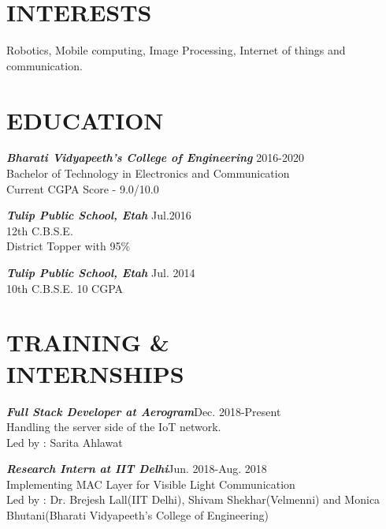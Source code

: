 \documentclass[margin, 10pt]{res} %
\begin{document}
\begin{resume}

 
\section{INTERESTS}  

Robotics, Mobile computing, Image Processing, Internet of things and communication.

\section{EDUCATION} 
{\sl \bf{Bharati Vidyapeeth's College of Engineering}} \hfill 2016-2020\\ Bachelor of Technology in Electronics and Communication\\
Current CGPA Score - 9.0/10.0

{\sl \bf{Tulip Public School, Etah}}
\hfill Jul.2016 \\12th C.B.S.E.  \\District Topper with 95\%

{\sl \bf{Tulip Public School, Etah}}
\hfill Jul. 2014 \\10th C.B.S.E. 10 CGPA\ 


\section{TRAINING \& \\ INTERNSHIPS}
{\sl \bf{Full Stack Developer at Aerogram}}\hfill Dec. 2018-Present\\
Handling the server side of the IoT network. \\
Led by : Sarita Ahlawat

{\sl \bf{Research Intern at IIT Delhi}}\hfill Jun. 2018-Aug. 2018\\
Implementing MAC Layer for Visible Light Communication \\
Led by : Dr. Brejesh Lall(IIT Delhi), Shivam Shekhar(Velmenni) and Monica Bhutani(Bharati Vidyapeeth's College of Engineering)


\end{resume}
\end{document}
